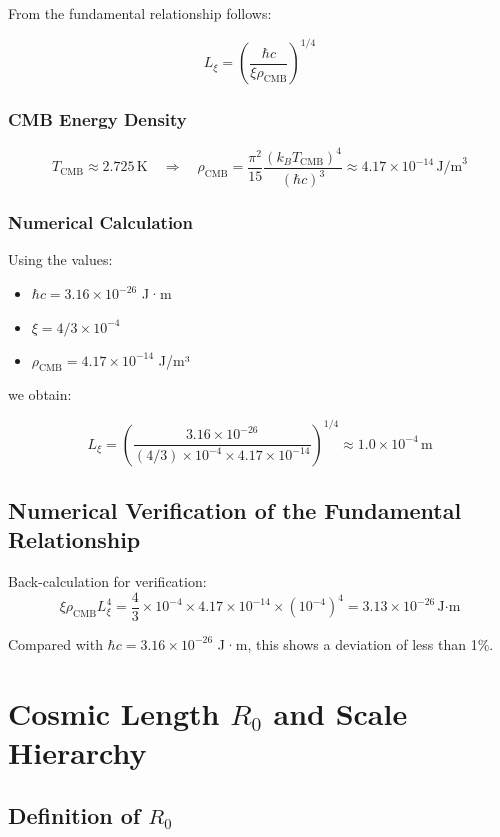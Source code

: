\documentclass[12pt,a4paper]{article}
\numberwithin{equation}{section}
\begin{document}
	From the fundamental relationship follows:
	
	\[
	L_\xi = \left(\frac{\hbar c}{\xi \rho_{\text{CMB}}}\right)^{1/4}
	\]
	
	\subsubsection{CMB Energy Density}
	
	\[
	T_{\text{CMB}} \approx 2.725\,\text{K} \quad \Rightarrow \quad \rho_{\text{CMB}} = \frac{\pi^2}{15} \frac{(k_B T_{\text{CMB}})^4}{(\hbar c)^3} \approx 4.17 \times 10^{-14}\, \text{J/m}^3
	\]
	
	\subsubsection{Numerical Calculation}
	
	Using the values:
	\begin{itemize}
		\item $\hbar c = 3.16 \times 10^{-26}$ J·m
		\item $\xi = 4/3 \times 10^{-4}$
		\item $\rho_{\text{CMB}} = 4.17 \times 10^{-14}$ J/m³
	\end{itemize}
	
	we obtain:
	
	\[
	L_\xi = \left(\frac{3.16 \times 10^{-26}}{(4/3) \times 10^{-4} \times 4.17 \times 10^{-14}}\right)^{1/4} \approx 1.0 \times 10^{-4}\,\text{m}
	\]
	
	\subsection{Numerical Verification of the Fundamental Relationship}
	
	Back-calculation for verification:
	\[
	\xi \rho_{\text{CMB}} L_\xi^4 = \frac{4}{3} \times 10^{-4} \times 4.17 \times 10^{-14} \times (10^{-4})^4 = 3.13 \times 10^{-26}\,\text{J·m}
	\]
	
	Compared with $\hbar c = 3.16 \times 10^{-26}$ J·m, this shows a deviation of less than 1\%.
	
	\section{Cosmic Length $R_0$ and Scale Hierarchy}
	
	\subsection{Definition of $R_0$}
	
\end{document}

